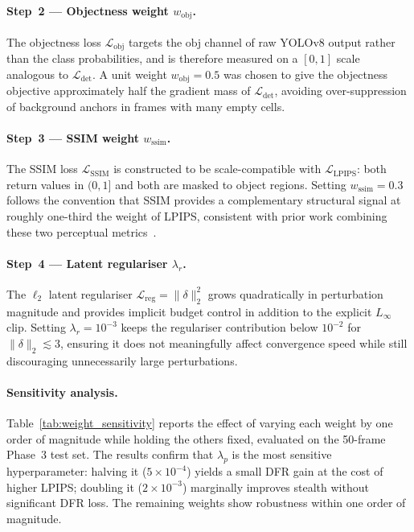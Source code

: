 \documentclass[12pt,a4paper]{report}
\begin{document}
\paragraph{Step~2 — Objectness weight $w_\text{obj}$.}
The objectness loss $\mathcal{L}_\text{obj}$ targets the $\text{obj}$
channel of raw YOLOv8 output rather than the class probabilities, and
is therefore measured on a $[0,1]$ scale analogous to
$\mathcal{L}_\text{det}$.  A unit weight $w_\text{obj} = 0.5$ was
chosen to give the objectness objective approximately half the gradient
mass of $\mathcal{L}_\text{det}$, avoiding over-suppression of
background anchors in frames with many empty cells.

\paragraph{Step~3 — SSIM weight $w_\text{ssim}$.}
The SSIM loss $\mathcal{L}_\text{SSIM}$ is constructed to be
scale-compatible with $\mathcal{L}_\text{LPIPS}$: both return values in
$(0,1]$ and both are masked to object regions.  Setting
$w_\text{ssim} = 0.3$ follows the convention that SSIM provides a
complementary structural signal at roughly one-third the weight of
LPIPS, consistent with prior work combining these two perceptual
metrics~\cite{zhao2016loss}.

\paragraph{Step~4 — Latent regulariser $\lambda_r$.}
The $\ell_2$ latent regulariser $\mathcal{L}_\text{reg} = \|\delta\|_2^2$
grows quadratically in perturbation magnitude and provides implicit
budget control in addition to the explicit $L_\infty$ clip.  Setting
$\lambda_r = 10^{-3}$ keeps the regulariser contribution below
$10^{-2}$ for $\|\delta\|_2 \lesssim 3$, ensuring it does not
meaningfully affect convergence speed while still discouraging
unnecessarily large perturbations.

\paragraph{Sensitivity analysis.}
Table~\ref{tab:weight_sensitivity} reports the effect of varying each
weight by one order of magnitude while holding the others fixed,
evaluated on the 50-frame Phase~3 test set.  The results confirm that
$\lambda_p$ is the most sensitive hyperparameter: halving it
($5 \times 10^{-4}$) yields a small DFR gain at the cost of higher
LPIPS; doubling it ($2 \times 10^{-3}$) marginally improves stealth
without significant DFR loss.  The remaining weights show robustness
within one order of magnitude.
\end{document}
